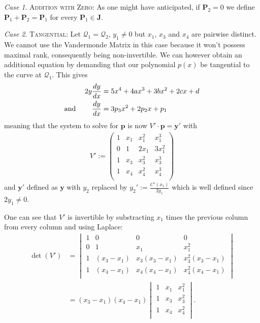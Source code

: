 \documentclass[english,11pt,a4paper]{article}
\theoremstyle{definition}
\theoremstyle{remark}
\theoremstyle{case}
\newtheorem{case}{Case}
\renewcommand{\P}{\mathbf{P}}
\newcommand{\q}{\mathcal{Q}}
\newcommand{\J}{\mathbf{J}}
\begin{document}
\setcounter{case}{-1}

\begin{case}
  {\scshape Addition with Zero:} As one might have anticipated, if $\P_2 = 0$ we define $\P_1 + \P_2 = \P_1$ for every $\P_1 \in \J$.
\end{case}

\setcounter{case}{1}
\begin{case}
	{\scshape Tangential:} Let $\q_1 = \q_2$, $y_1 \neq 0$ but $x_1$, $x_3$ and $x_4$ are pairwise distinct. We cannot use the Vandermonde Matrix in this case because it won't possess maximal rank, consequently being non-invertible. We can however obtain an additional equation by demanding that our polynomial $p(x)$ be tangential to the curve at $\q_1$. This gives
	\begin{align*}
	  2 y \frac{dy}{dx} &= 5  x^4 + 4 a x^3 + 3 b x^2 + 2 c x + d \\
	  \text{and\hspace{8mm}} \frac{dy}{dx} &= 3 p_3 x^2 + 2 p_2 x + p_1
	\end{align*}
	meaning that the system to solve for $\mathbf{p}$ is now $V' \cdot \mathbf{p} = \mathbf{y'}$ with
	\begin{align*}V':=
		\begin{pmatrix}
			1 & x_1 & x_1^2 & x_1^3\\
			0 & 1 & 2 x_1 & 3 x_1^2\\
			1 & x_3 & x_3^2 & x_3^3\\
			1 & x_4 & x_4^2 & x_4^3\\
		\end{pmatrix}
	\end{align*}
	and $\mathbf{y'}$ defined as $\mathbf{y}$ with $y_2$ replaced by $y_2':=\frac{C'(x_1)}{2 y_1}$ which is well defined since $2y_1 \neq 0$.

	One can see that $V'$ is invertible by substracting $x_1$ times the previous column from every column and using Laplace:
	\begin{align*}\det (V') &=
		\begin{vmatrix}
			1 & 0 & 0 & 0\\
			0 & 1 & x_1 & x_1^2\\
			1 & (x_3-x_1) & x_3(x_3-x_1) & x_3^2(x_3-x_1)\\
			1 & (x_4-x_1) & x_4(x_4-x_1) & x_4^2(x_4-x_1)\\
		\end{vmatrix}
		\\
		&= (x_3-x_1)(x_4-x_1)
		\begin{vmatrix}
			1 & x_1 & x_1^2\\
			1 & x_3 & x_3^2\\
			1 & x_4 & x_4^2\\
		\end{vmatrix}.
	\end{align*}


\end{case}
\end{document}

